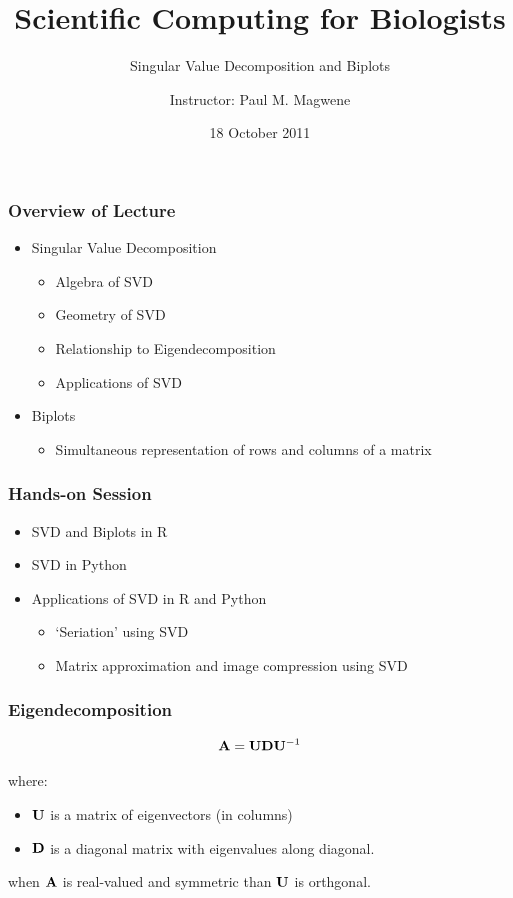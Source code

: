 \documentclass{beamer}
\title{Scientific Computing for Biologists}
\subtitle{Singular Value Decomposition and Biplots}
\author{Instructor: Paul M. Magwene}
\date{18 October 2011}
\begin{document}
\begin{frame}
\titlepage
\end{frame}

\begin{frame}
  \frametitle{Overview of Lecture}
  
\begin{itemize}
		\item Singular Value Decomposition
		\begin{itemize}
			\item Algebra of SVD
			\item Geometry of SVD
			\item Relationship to Eigendecomposition
			\item Applications of SVD			
		\end{itemize}		
		\item Biplots
		\begin{itemize}
			\item Simultaneous representation of rows and columns of a matrix
		\end{itemize}			
\end{itemize}

\end{frame}

\begin{frame}
  \frametitle{Hands-on Session}
\begin{itemize}
    \item SVD and Biplots in R
    \item SVD in Python
    \item Applications of SVD in R and Python
    		\begin{itemize}
    		\item `Seriation' using SVD
			\item Matrix approximation and image compression using SVD
		\end{itemize}
\end{itemize} 


\end{frame}		


\begin{frame}
  \frametitle{Eigendecomposition}

$$ \mathbf{A} = \mathbf{U}\mathbf{D}\mathbf{U}^{-1} $$

where:
\begin{itemize}
\item  $\mathbf{U}$ is a matrix of eigenvectors (in columns)
\item $\mathbf{D}$ is a diagonal matrix with eigenvalues along diagonal.
\end{itemize}

\medskip
when $\mathbf{A}$ is real-valued and symmetric than $\mathbf{U}$ is orthgonal.

\end{frame}
\end{document}
